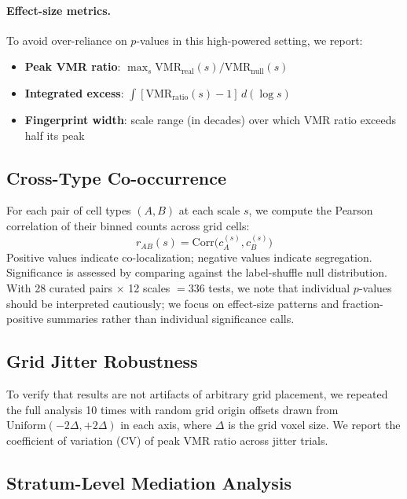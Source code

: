 \documentclass[11pt,a4paper]{article}
\newcommand{\vmr}{\mathrm{VMR}}
\begin{document}
\paragraph{Effect-size metrics.}
To avoid over-reliance on $p$-values in this high-powered setting, we report:
\begin{itemize}
  \item \textbf{Peak VMR ratio}: $\max_s \vmr_\text{real}(s) / \vmr_\text{null}(s)$
  \item \textbf{Integrated excess}: $\int [\vmr_\text{ratio}(s) - 1] \, d(\log s)$
  \item \textbf{Fingerprint width}: scale range (in decades) over which VMR ratio
    exceeds half its peak
\end{itemize}

\subsection{Cross-Type Co-occurrence}
\label{sec:cooccurrence}

For each pair of cell types $(A, B)$ at each scale $s$, we compute the Pearson
correlation of their binned counts across grid cells:
\begin{equation}
  r_{AB}(s) = \mathrm{Corr}\bigl(c_A^{(s)}, c_B^{(s)}\bigr)
\end{equation}
Positive values indicate co-localization; negative values indicate segregation.
Significance is assessed by comparing against the label-shuffle null distribution.
With 28 curated pairs $\times$ 12 scales $= 336$ tests, we note that individual
$p$-values should be interpreted cautiously; we focus on effect-size patterns and
fraction-positive summaries rather than individual significance calls.

\subsection{Grid Jitter Robustness}
\label{sec:jitter}

To verify that results are not artifacts of arbitrary grid placement, we repeated
the full analysis 10 times with random grid origin offsets drawn from
$\mathrm{Uniform}(-2\Delta, +2\Delta)$ in each axis, where $\Delta$ is the
grid voxel size. We report the coefficient of variation (CV) of peak VMR ratio
across jitter trials.

\subsection{Stratum-Level Mediation Analysis}
\label{sec:mediation}
\end{document}
